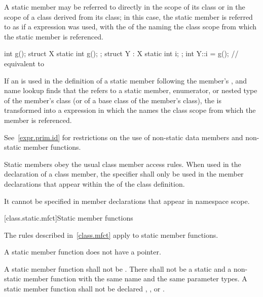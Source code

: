 \pnum
A static member may be referred to directly in the scope of its
class or in the scope of a class derived
from its class; in this case, the static member is referred to
as if a  expression was used, with the
 of the  naming
the class scope from which the static member is referenced.
\begin{example}

\begin{codeblock}
int g();
struct X {
  static int g();
};
struct Y : X {
  static int i;
};
int Y::i = g();                 // equivalent to 
\end{codeblock}
\end{example}

\pnum
If an  is used in the
definition of a static member following the member's
, and name lookup
finds that the  refers to a static
member, enumerator, or nested type of the member's class (or of a base
class of the member's class), the  is
transformed into a  expression in which the
 names the class scope from which the
member is referenced.
\begin{note}
See~\ref{expr.prim.id} for restrictions on the use of non-static data
members and non-static member functions.
\end{note}


\pnum
Static members obey the usual class member access rules.
When used in the declaration of a class
member, the  specifier shall only be used in the member
declarations that appear within the  of
the class definition.
\begin{note}
It cannot be specified in member declarations that appear in namespace scope.
\end{note}

[class.static.mfct]{Static member functions}
%

\pnum
\begin{note}
The rules described in~\ref{class.mfct} apply to static member
functions.
\end{note}

\pnum
\begin{note}
A static member function does not have a 
pointer.
\end{note}
A static member function shall not be . There
shall not be a static and a non-static member function with the
same name and the same parameter types. A
static member function shall not be declared ,
, or .

